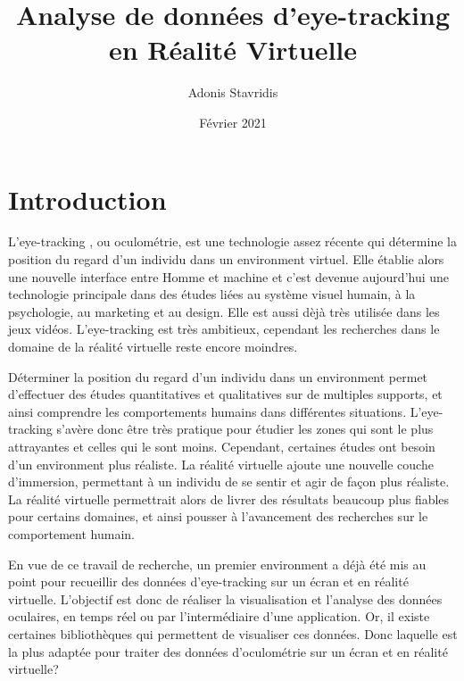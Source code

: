 \documentclass[12pt]{article}
\title{\textbf{Analyse de données d’eye-tracking en Réalité Virtuelle}}
\author{\Large{Adonis Stavridis}}
\date{Février 2021}
\begin{document}

\maketitle
\tableofcontents
\pagebreak


\section{Introduction}

L'eye-tracking \cite{wiki:eye_tracking}, ou oculométrie, est une technologie
assez récente qui détermine la position du regard d'un individu dans un
environment virtuel. Elle établie alors une nouvelle interface entre Homme et
machine et c'est devenue aujourd'hui une technologie principale dans des études
liées au système visuel humain, à la psychologie, au marketing et au design.
Elle est aussi dèjà très utilisée dans les jeux vidéos. L'eye-tracking est très
ambitieux, cependant les recherches dans le domaine de la réalité virtuelle
reste encore moindres.

\bigskip
Déterminer la position du regard d'un individu dans un environment permet
d'effectuer des études quantitatives et qualitatives sur de multiples supports,
et ainsi comprendre les comportements humains dans différentes situations.
L'eye-tracking s'avère donc être très pratique pour étudier les zones qui sont
le plus attrayantes et celles qui le sont moins. Cependant, certaines études
ont besoin d'un environment plus réaliste. La réalité virtuelle ajoute une
nouvelle couche d'immersion, permettant à un individu de se sentir et agir de
façon plus réaliste. La réalité virtuelle permettrait alors de livrer des
résultats beaucoup plus fiables pour certains domaines, et ainsi pousser à
l'avancement des recherches sur le comportement humain.

\bigskip
En vue de ce travail de recherche, un premier environment a déjà été mis au
point pour recueillir des données d'eye-tracking sur un écran et en réalité
virtuelle. L'objectif est donc de réaliser la visualisation et l'analyse des
données oculaires, en temps réel ou par l'intermédiaire d'une application. Or,
il existe certaines bibliothèques qui permettent de visualiser ces données. Donc
laquelle est la plus adaptée pour traiter des données d'oculométrie sur un écran
et en réalité virtuelle?
\end{document}
